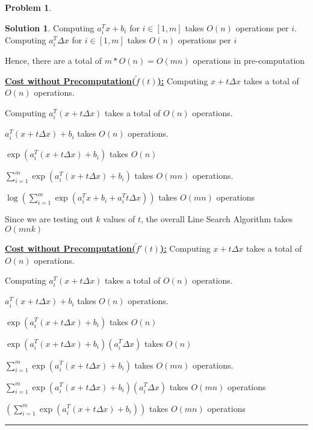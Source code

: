 \documentclass{article}
\theoremstyle{definition}
\newtheorem{problem}{Problem}
\def\fline{\rule{0.75\linewidth}{0.5pt}}
\newcommand{\finishline}{\begin{center}\fline\end{center}}
\newtheorem*{solution*}{Solution}
\newenvironment{solution}{\begin{solution*}}{{\finishline} \end{solution*}}
\begin{document}
\begin{problem}
\begin{enumerate}
\begin{solution}
        Computing $a_i^Tx + b_i$ for $i \in [1, m]$ takes $O(n)$ operations per $i$. \newline 
        Computing $a_i^T \Delta x$ for $i \in [1, m]$ takes $O(n)$ operations per $i$

        Hence, there are a total of $m * O(n) = O(mn)$ operations in pre-computation \newline

        
        \textbf{\underline{Cost without Precomputation($\tilde{f}(t)$):}} \newline 
        Computing $x + t \Delta x$ takes a total of $O(n)$ operations. 
        
        Computing $a_i^T(x + t \Delta x)$ takes a total of $O(n)$ operations. 
        
        $a_i^T(x + t\Delta x) + b_i$ takes $O(n)$ operations. 
        
        $\exp(a_i^T(x + t\Delta x) + b_i)$ takes $O(n)$  
        
        $\sum_{i=1}^{m} \exp(a_i^T(x + t\Delta x) + b_i)$ takes $O(mn)$ operations. 

        $\log(\sum_{i=1}^{m} \exp(a_i^Tx + b_i + a_i^T t\Delta x))$ takes $O(mn)$ operations
                
        Since we are testing out $k$ values of $t$, the overall Line Search Algorithm takes $O(mnk)$ \newline 
        
        \textbf{\underline{Cost without Precomputation($\tilde{f}'(t)$):}} \newline 
        Computing $x + t \Delta x$ takes a total of $O(n)$ operations. 
        
        Computing $a_i^T(x + t \Delta x)$ takes a total of $O(n)$ operations. 
        
        $a_i^T(x + t\Delta x) + b_i$ takes $O(n)$ operations. 
        
        $\exp(a_i^T(x + t\Delta x) + b_i)$ takes $O(n)$  
        
        $\exp(a_i^T(x + t\Delta x) + b_i) (a_i^T \Delta x)$ takes $O(n)$

        $\sum_{i=1}^{m} \exp(a_i^T(x + t\Delta x) + b_i)$ takes $O(mn)$ operations.

        $\sum_{i=1}^{m} \exp(a_i^T(x + t\Delta x) + b_i) (a_i^T \Delta x)$ takes $O(mn)$ operations

        $(\sum_{i=1}^{m} \exp(a_i^T(x + t\Delta x) + b_i))$ takes $O(mn)$ operations


\end{solution}
\end{enumerate}
\end{problem}
\end{document}
